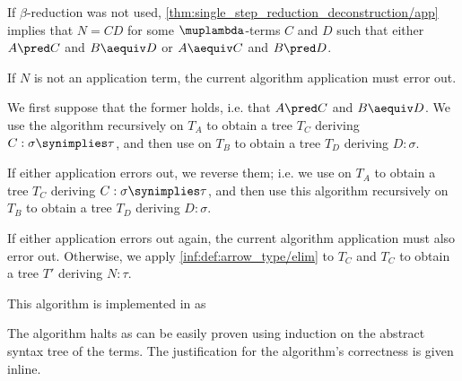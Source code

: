 \begin{algorithm}
\begin{thmenum}
\begin{thmenum}
       If \( \beta \)-reduction was not used, \cref{thm:single_step_reduction_deconstruction/app} implies that \( N = CD \) for some \( \muplambda \)-terms \( C \) and \( D \) such that either \( A \pred C \) and \( B \aequiv D \) or \( A \aequiv C \) and \( B \pred D \).

      If \( N \) is not an application term, the current algorithm application must error out.

      We first suppose that the former holds, i.e. that \( A \pred C \) and \( B \aequiv D \). We use the algorithm recursively on \( T_A \) to obtain a tree \( T_C \) deriving \( C: \sigma \synimplies \tau \), and then use  on \( T_B \) to obtain a tree \( T_D \) deriving \( D: \sigma \).

      If either application errors out, we reverse them; i.e. we use  on \( T_A \) to obtain a tree \( T_C \) deriving \( C: \sigma \synimplies \tau \), and then use this algorithm recursively on \( T_B \) to obtain a tree \( T_D \) deriving \( D: \sigma \).

      If either application errors out again, the current algorithm application must also error out. Otherwise, we apply \ref{inf:def:arrow_type/elim} to \( T_C \) and \( T_C \) to obtain a tree \( T' \) deriving \( N: \tau \).
    \end{thmenum}
  \end{thmenum}
\end{algorithm}
\begin{comments}
  \item This algorithm is implemented in \cite{notebook:code} as
  \begin{CodeRefDisplay}
  \end{CodeRefDisplay}
\end{comments}
\begin{defproof}
  The algorithm halts as can be easily proven using induction on the abstract syntax tree of the terms. The justification for the algorithm's correctness is given inline.
\end{defproof}

